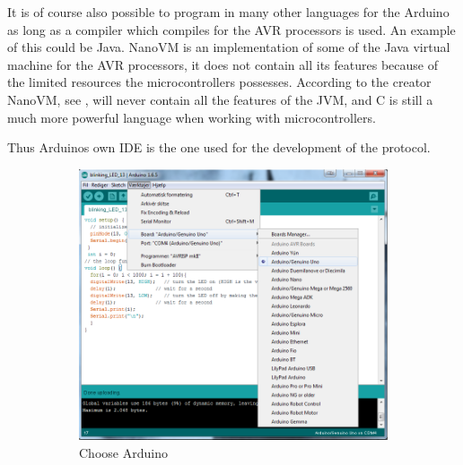It is of course also possible to program in many other languages for the Arduino as long as a compiler which compiles for the AVR processors is used.
An example of this could be Java.
NanoVM is an implementation of some of the Java virtual machine for the AVR processors, it does not contain all its features because of the limited resources the microcontrollers possesses. 
According to the creator NanoVM, see \cite{NanoVM}, will never contain all the features of the JVM, and C is still a much more powerful language when working with microcontrollers. 

Thus Arduinos own IDE is the one used for the development of the protocol.

\begin{figure}[!ht]
    \begin{subfigure}{0.47\linewidth}
        \centering
        \includegraphics[width=\linewidth]{Figures/ChooseArduino.png}
        \caption{Choose Arduino}
        \label{fig:choose_arduino}
    \end{subfigure}\hfill
    \begin{subfigure}{0.47\linewidth}
        \centering

\end{subfigure}
\end{figure}

